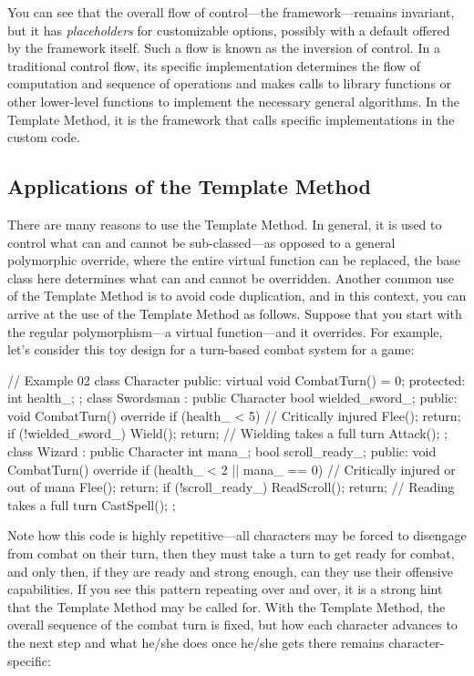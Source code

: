 You can see that the overall flow of control---the framework---remains invariant, but it has \emph{placeholders} for customizable options, possibly with a default offered by the framework itself. Such a flow is known as the inversion of control. In a traditional control flow, its specific implementation determines the flow of computation and sequence of operations and makes calls to library functions or other lower-level functions to implement the necessary general algorithms. In the Template Method, it is the framework that calls specific implementations in the custom code.

\subsection{Applications of the Template Method}

There are many reasons to use the Template Method. In general, it is used to control what can and cannot be sub-classed---as opposed to a general polymorphic override, where the entire virtual function can be replaced, the base class here determines what can and cannot be overridden. Another common use of the Template Method is to avoid code duplication, and in this context, you can arrive at the use of the Template Method as follows. Suppose that you start with the regular polymorphism---a virtual function---and it overrides. For example, let's consider this toy design for a turn-based combat system for a game:

\begin{code}
// Example 02
class Character {
  public:
  virtual void CombatTurn() = 0;
  protected:
  int health_;
};
class Swordsman : public Character {
  bool wielded_sword_;
  public:
  void CombatTurn() override {
    if (health_ < 5) { // Critically injured
      Flee();
      return;
    }
    if (!wielded_sword_) {
      Wield();
      return; // Wielding takes a full turn
    }
    Attack();
  }
};
class Wizard : public Character {
  int mana_;
  bool scroll_ready_;
  public:
  void CombatTurn() override {
    if (health_ < 2 ||
        mana_ == 0) { // Critically injured or out of mana
      Flee();
      return;
    }
    if (!scroll_ready_) {
      ReadScroll();
      return; // Reading takes a full turn
    }
    CastSpell();
  }
};
\end{code}

Note how this code is highly repetitive---all characters may be forced to disengage from combat on their turn, then they must take a turn to get ready for combat, and only then, if they are ready and strong enough, can they use their offensive capabilities. If you see this pattern repeating over and over, it is a strong hint that the Template Method may be called for. With the Template Method, the overall sequence of the combat turn is fixed, but how each character advances to the next step and what he/she does once he/she gets there remains character-specific:

